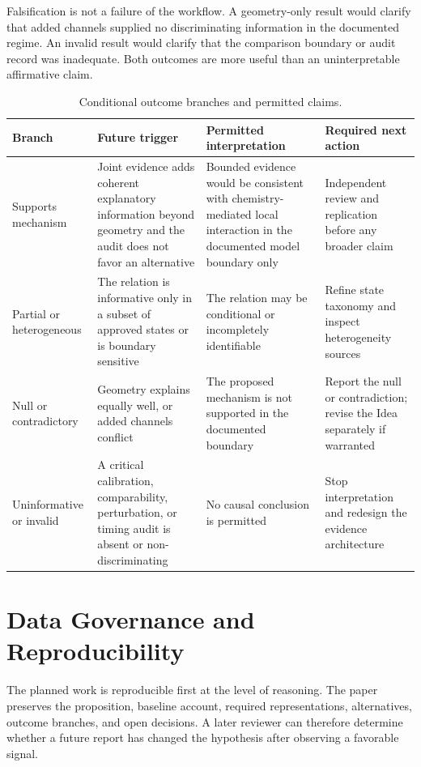 \documentclass[conference]{IEEEtran}
\begin{document}
Falsification is not a failure of the workflow. A geometry-only result would clarify that added channels supplied no discriminating information in the documented regime. An invalid result would clarify that the comparison boundary or audit record was inadequate. Both outcomes are more useful than an uninterpretable affirmative claim.

\begin{table}[!t]
\caption{Conditional outcome branches and permitted claims.}
\label{tab:branches}
\centering
\footnotesize
\begin{tabular}{L{0.18\textwidth}L{0.29\textwidth}L{0.25\textwidth}L{0.18\textwidth}}
\toprule
Branch & Future trigger & Permitted interpretation & Required next action \\
\midrule
Supports mechanism & Joint evidence adds coherent explanatory information beyond geometry and the audit does not favor an alternative & Bounded evidence would be consistent with chemistry-mediated local interaction in the documented model boundary only & Independent review and replication before any broader claim \\
Partial or heterogeneous & The relation is informative only in a subset of approved states or is boundary sensitive & The relation may be conditional or incompletely identifiable & Refine state taxonomy and inspect heterogeneity sources \\
Null or contradictory & Geometry explains equally well, or added channels conflict & The proposed mechanism is not supported in the documented boundary & Report the null or contradiction; revise the Idea separately if warranted \\
Uninformative or invalid & A critical calibration, comparability, perturbation, or timing audit is absent or non-discriminating & No causal conclusion is permitted & Stop interpretation and redesign the evidence architecture \\
\bottomrule
\end{tabular}
\end{table}

\section{Data Governance and Reproducibility}

The planned work is reproducible first at the level of reasoning. The paper preserves the proposition, baseline account, required representations, alternatives, outcome branches, and open decisions. A later reviewer can therefore determine whether a future report has changed the hypothesis after observing a favorable signal.
\end{document}
